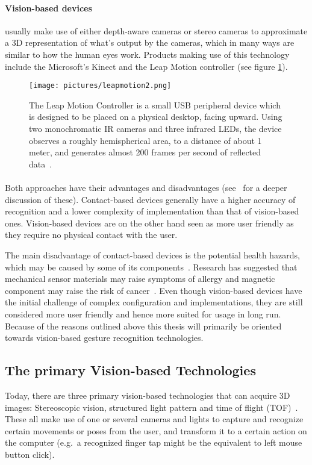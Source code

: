 \paragraph{Vision-based devices} usually make use of either depth-aware cameras or stereo cameras to approximate a 3D representation of what's output by the cameras, 
which in many ways are similar to how the human eyes work. 
Products making use of this technology include the Microsoft's Kinect and the Leap Motion controller (see figure \ref{fig:leapmotion}). 

\begin{figure}%
	\texttt{[image: pictures/leapmotion2.png]}
	\caption[The Leap Motion Controller]{The Leap Motion Controller is a small USB peripheral device which is designed to be placed on a physical desktop, 
	facing upward. Using two monochromatic IR cameras and three infrared LEDs, the device observes a roughly hemispherical area, to a distance of about 1 meter, 
	and generates almost 200 frames per second of reflected data~\citep{LeapMotion2016}.}
	\label{fig:leapmotion}
\end{figure} 

\paragraph{}Both approaches have their advantages and disadvantages (see~\citet{Rautaray2015} for a deeper discussion of these). 
Contact-based devices generally have a higher accuracy of recognition and a lower complexity of implementation than that of vision-based ones. 
Vision-based devices are on the other hand seen as more user friendly as they require no physical contact with the user. 

The main disadvantage of contact-based devices is the potential health hazards, which may be caused by some of its components~\citep{Schultz2003}. 
Research has suggested that mechanical sensor materials may raise symptoms of allergy and magnetic component may raise the risk of cancer~\citep{Nishikawa2003}. 
Even though vision-based devices have the initial challenge of complex configuration and implementations, 
they are still considered more user friendly and hence more suited for usage in long run. Because of the reasons outlined above this thesis will primarily 
be oriented towards vision-based gesture recognition technologies. 

\subsection{The primary Vision-based Technologies}
Today, there are three primary vision-based technologies that can acquire 3D images: Stereoscopic vision, structured light pattern and time of flight (TOF)~\citep{Ko2012}.
These all make use of one or several cameras and lights to capture and recognize certain movements or poses from the user, 
and transform it to a certain action on the computer (e.g.~a recognized finger tap might be the equivalent to left mouse button click). 

